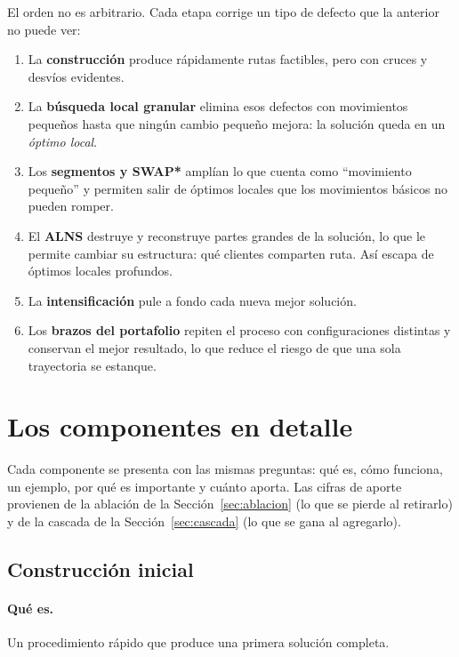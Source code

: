 \documentclass[11pt,a4paper]{article}
\begin{document}
El orden no es arbitrario. Cada etapa corrige un tipo de defecto que la anterior no puede ver:

\begin{enumerate}[leftmargin=1.5em]
\item La \textbf{construcción} produce rápidamente rutas factibles, pero con cruces y desvíos
evidentes.
\item La \textbf{búsqueda local granular} elimina esos defectos con movimientos pequeños hasta que
ningún cambio pequeño mejora: la solución queda en un \emph{óptimo local}.
\item Los \textbf{segmentos y SWAP*} amplían lo que cuenta como ``movimiento pequeño'' y permiten
salir de óptimos locales que los movimientos básicos no pueden romper.
\item El \textbf{ALNS} destruye y reconstruye partes grandes de la solución, lo que le permite
cambiar su estructura: qué clientes comparten ruta. Así escapa de óptimos locales profundos.
\item La \textbf{intensificación} pule a fondo cada nueva mejor solución.
\item Los \textbf{brazos del portafolio} repiten el proceso con configuraciones distintas y conservan el
mejor resultado, lo que reduce el riesgo de que una sola trayectoria se estanque.
\end{enumerate}

\section{Los componentes en detalle}
\label{sec:componentes}

Cada componente se presenta con las mismas preguntas: qué es, cómo funciona, un ejemplo, por qué es
importante y cuánto aporta. Las cifras de aporte provienen de la ablación de la
Sección~\ref{sec:ablacion} (lo que se pierde al retirarlo) y de la cascada de la
Sección~\ref{sec:cascada} (lo que se gana al agregarlo).

\subsection{Construcción inicial}
\label{sec:construccion}

\paragraph{Qué es.} Un procedimiento rápido que produce una primera solución completa.
\end{document}
